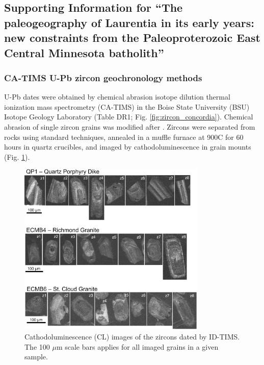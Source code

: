 \documentclass[11pt,letterpaper]{article}
\begin{document}
\renewcommand{\thefigure}{SI\arabic{figure}}

\subsection*{Supporting Information for ``The paleogeography of Laurentia in its early years: new constraints from the Paleoproterozoic East Central Minnesota batholith''}

\subsubsection*{CA-TIMS U-Pb zircon geochronology methods}

U-Pb dates were obtained by chemical abrasion isotope dilution thermal ionization mass spectrometry (CA-TIMS) in the Boise State University (BSU) Isotope Geology Laboratory (Table DR1; Fig. \ref{fig:zircon_concordia}). Chemical abrasion of single zircon grains was modified after \cite{Mattinson2005a}. Zircons were separated from rocks using standard techniques, annealed in a muffle furnace at 900\textdegree C for 60 hours in quartz crucibles, and imaged by cathodoluminescence in grain mounts (Fig. \ref{fig:zircon_CL}). 

\begin{figure}[!ht]
\noindent\includegraphics[width=0.8\textwidth]{./figures/SI_zircon_CLimages.png}
\centering
\caption{\small{Cathodoluminescence (CL) images of the zircons dated by ID-TIMS. The 100 $\mu$m scale bars applies for all imaged grains in a given sample.}}
\label{fig:zircon_CL}
\end{figure}
\end{document}
